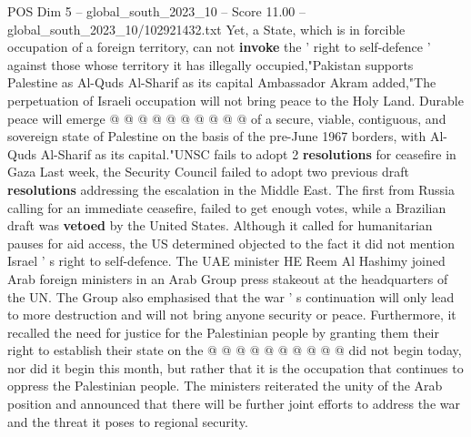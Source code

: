 \begin{textsample}{POS Dim 5 – global\_south\_2023\_10 – Score 11.00 – global\_south\_2023\_10/102921432.txt}
Yet, a State, which is in forcible occupation of a foreign territory, can not \textbf{invoke} the ' right to self-defence ' against those whose territory it has illegally occupied,"Pakistan supports Palestine as Al-Quds Al-Sharif as its capital Ambassador Akram added,"The perpetuation of Israeli occupation will not bring peace to the Holy Land.
Durable peace will emerge @ @ @ @ @ @ @ @ @ @ of a secure, viable, contiguous, and sovereign state of Palestine on the basis of the pre-June 1967 borders, with Al-Quds Al-Sharif as its capital."UNSC fails to adopt 2 \textbf{resolutions} for ceasefire in Gaza Last week, the Security Council failed to adopt two previous draft \textbf{resolutions} addressing the escalation in the Middle East.
The first from Russia calling for an immediate ceasefire, failed to get enough votes, while a Brazilian draft was \textbf{vetoed} by the United States.
Although it called for humanitarian pauses for aid access, the US determined objected to the fact it did not mention Israel ' s right to self-defence.
The UAE minister HE Reem Al Hashimy joined Arab foreign ministers in an Arab Group press stakeout at the headquarters of the UN.
The Group also emphasised that the war ' s continuation will only lead to more destruction and will not bring anyone security or peace.
Furthermore, it recalled the need for justice for the Palestinian people by granting them their right to establish their state on the @ @ @ @ @ @ @ @ @ @ did not begin today, nor did it begin this month, but rather that it is the occupation that continues to oppress the Palestinian people.
The ministers reiterated the unity of the Arab position and announced that there will be further joint efforts to address the war and the threat it poses to regional security.

\end{textsample}

